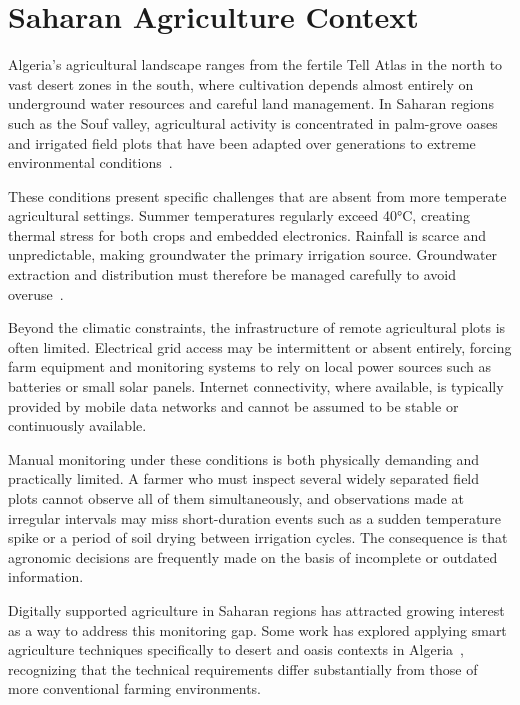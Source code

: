 \section{Saharan Agriculture Context}
\label{sec:saharan-agriculture}

Algeria's agricultural landscape ranges from the fertile Tell Atlas in the north
to vast desert zones in the south, where cultivation depends almost entirely on
underground water resources and careful land management. In Saharan regions such
as the Souf valley, agricultural activity is concentrated in palm-grove oases and
irrigated field plots that have been adapted over generations to extreme
environmental conditions~\cite{hadeid_saharan_agriculture_algerian_oasis}.

These conditions present specific challenges that are absent from more temperate
agricultural settings. Summer temperatures regularly exceed 40°C, creating thermal
stress for both crops and embedded electronics. Rainfall is scarce and
unpredictable, making groundwater the primary irrigation source. Groundwater
extraction and distribution must therefore be managed carefully to avoid
overuse~\cite{desert_agriculture_food_security_algeria}.

Beyond the climatic constraints, the infrastructure of remote agricultural
plots is often limited. Electrical grid access may be intermittent or absent
entirely, forcing farm equipment and monitoring systems to rely on local power
sources such as batteries or small solar panels. Internet connectivity, where
available, is typically provided by mobile data networks and cannot be assumed to
be stable or continuously available.

Manual monitoring under these conditions is both physically demanding and
practically limited. A farmer who must inspect several widely separated field
plots cannot observe all of them simultaneously, and observations made at
irregular intervals may miss short-duration events such as a sudden temperature
spike or a period of soil drying between irrigation cycles. The consequence is
that agronomic decisions are frequently made on the basis of incomplete or
outdated information.

Digitally supported agriculture in Saharan regions has attracted growing interest
as a way to address this monitoring gap. Some work has explored applying smart
agriculture techniques specifically to desert and oasis contexts in
Algeria~\cite{smart_agriculture_desert_wadi_souf}, recognizing that the technical
requirements differ substantially from those of more conventional farming
environments.

